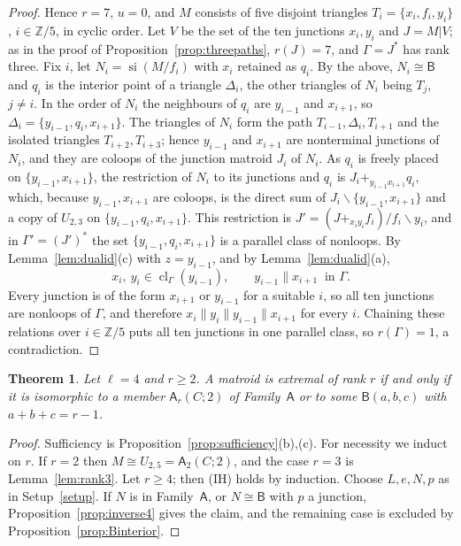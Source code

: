 \documentclass[11pt]{amsart}
\newtheorem{theorem}{Theorem}[section]
\theoremstyle{definition}
\theoremstyle{remark}
\numberwithin{equation}{section}
\newcommand{\cl}{\operatorname{cl}}
\newcommand{\si}{\operatorname{si}}
\newcommand{\FA}{\mathsf{A}}
\newcommand{\FB}{\mathsf{B}}
\begin{document}
\begin{proof}
Hence $r=7$, $u=0$, and $M$ consists of five disjoint triangles $T_i=\{x_i,f_i,y_i\}$, $i\in\mathbb Z/5$, in cyclic order. Let $V$ be the set of the ten junctions $x_i,y_i$ and $J=M|V$; as in the proof of Proposition~\ref{prop:threepaths}, $r(J)=7$, and $\Gamma=J^*$ has rank three. Fix $i$, let $N_i=\si(M/f_i)$ with $x_i$ retained as $q_i$. By the above, $N_i\cong\FB$ and $q_i$ is the interior point of a triangle $\Delta_i$, the other triangles of $N_i$ being $T_j$, $j\ne i$. In the order of $N_i$ the neighbours of $q_i$ are $y_{i-1}$ and $x_{i+1}$, so $\Delta_i=\{y_{i-1},q_i,x_{i+1}\}$. The triangles of $N_i$ form the path $T_{i-1},\Delta_i,T_{i+1}$ and the isolated triangles $T_{i+2},T_{i+3}$; hence $y_{i-1}$ and $x_{i+1}$ are nonterminal junctions of $N_i$, and they are coloops of the junction matroid $J_i$ of $N_i$. As $q_i$ is freely placed on $\{y_{i-1},x_{i+1}\}$, the restriction of $N_i$ to its junctions and $q_i$ is $J_i+_{y_{i-1}x_{i+1}}q_i$, which, because $y_{i-1},x_{i+1}$ are coloops, is the direct sum of $J_i\backslash\{y_{i-1},x_{i+1}\}$ and a copy of $U_{2,3}$ on $\{y_{i-1},q_i,x_{i+1}\}$. This restriction is $J'=(J+_{x_iy_i}f_i)/f_i\backslash y_i$, and in $\Gamma'=(J')^*$ the set $\{y_{i-1},q_i,x_{i+1}\}$ is a parallel class of nonloops. By Lemma~\ref{lem:dualid}(c) with $z=y_{i-1}$, and by Lemma~\ref{lem:dualid}(a),
\[
x_i,\ y_i\in\cl_\Gamma(y_{i-1}),\qquad y_{i-1}\parallel x_{i+1}\ \text{ in }\Gamma .
\]
Every junction is of the form $x_{i+1}$ or $y_{i-1}$ for a suitable $i$, so all ten junctions are nonloops of $\Gamma$, and therefore $x_i\parallel y_i\parallel y_{i-1}\parallel x_{i+1}$ for every $i$. Chaining these relations over $i\in\mathbb Z/5$ puts all ten junctions in one parallel class, so $r(\Gamma)=1$, a contradiction.
\end{proof}

\begin{theorem}\label{thm:four}
Let $\ell=4$ and $r\ge2$. A matroid is extremal of rank $r$ if and only if it is isomorphic to a member $\FA_r(C;2)$ of Family~$\FA$ or to some $\FB(a,b,c)$ with $a+b+c=r-1$.
\end{theorem}

\begin{proof}
Sufficiency is Proposition~\ref{prop:sufficiency}(b),(c). For necessity we induct on $r$. If $r=2$ then $M\cong U_{2,5}=\FA_2(C;2)$, and the case $r=3$ is Lemma~\ref{lem:rank3}. Let $r\ge4$; then (IH) holds by induction. Choose $L,e,N,p$ as in Setup~\ref{setup}. If $N$ is in Family~$\FA$, or $N\cong\FB$ with $p$ a junction, Proposition~\ref{prop:inverse4} gives the claim, and the remaining case is excluded by Proposition~\ref{prop:Binterior}.
\end{proof}
\end{document}
